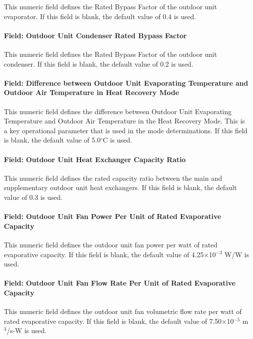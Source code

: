 This numeric field defines the Rated Bypass Factor of the outdoor unit evaporator. If this field is blank, the default value of 0.4 is used.

\paragraph{Field: Outdoor Unit Condenser Rated Bypass Factor}

This numeric field defines the Rated Bypass Factor of the outdoor unit condenser. If this field is blank, the default value of 0.2 is used.

\paragraph{Field: Difference between Outdoor Unit Evaporating Temperature and Outdoor Air Temperature in Heat Recovery Mode}

This numeric field defines the difference between Outdoor Unit Evaporating Temperature and Outdoor Air Temperature in the Heat Recovery Mode. This is a key operational parameter that is used in the mode determinations. If this field is blank, the default value of 5.0$^\circ$C is used.

\paragraph{Field: Outdoor Unit Heat Exchanger Capacity Ratio}

This numeric field defines the rated capacity ratio between the main and supplementary outdoor unit heat exchangers. If this field is blank, the default value of 0.3 is used.

\paragraph{Field: Outdoor Unit Fan Power Per Unit of Rated Evaporative Capacity}

This numeric field defines the outdoor unit fan power per watt of rated evaporative capacity. If this field is blank, the default value of 4.25$\times$10$^{-3}$ W/W is used.

\paragraph{Field: Outdoor Unit Fan Flow Rate Per Unit of Rated Evaporative Capacity}

This numeric field defines the outdoor unit fan volumetric flow rate per watt of rated evaporative capacity. If this field is blank, the default value of 7.50$\times$10$^{-5}$ m\(^{3}\)/s-W is used.

